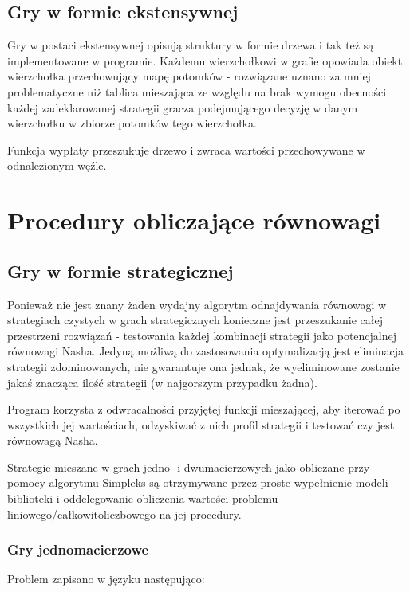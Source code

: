 \documentclass[polish]{standalone}
\begin{document}
\subsection{Gry w formie ekstensywnej}

Gry w postaci ekstensywnej opisują struktury w formie drzewa i tak też są implementowane w programie. Każdemu 
wierzchołkowi w grafie opowiada obiekt wierzchołka przechowujący mapę potomków - rozwiązane uznano za mniej
problematyczne niż tablica mieszająca ze względu na brak wymogu obecności każdej zadeklarowanej strategii gracza
podejmującego decyzję w danym wierzchołku w zbiorze potomków tego wierzchołka.

Funkcja wypłaty przeszukuje drzewo i zwraca wartości przechowywane w odnalezionym węźle.

\section{Procedury obliczające równowagi}

\subsection{Gry w formie strategicznej}

Ponieważ nie jest znany żaden wydajny algorytm odnajdywania równowagi w strategiach czystych w grach strategicznych
konieczne jest przeszukanie całej przestrzeni rozwiązań - testowania każdej kombinacji strategii jako potencjalnej
równowagi Nasha. Jedyną możliwą do zastosowania optymalizacją jest eliminacja strategii zdominowanych, nie gwarantuje
ona jednak, że wyeliminowane zostanie jakaś znacząca ilość strategii (w najgorszym przypadku żadna).

Program korzysta z odwracalności przyjętej funkcji mieszającej, aby iterować po wszystkich jej wartościach, odzyskiwać
z nich profil strategii i testować czy jest równowagą Nasha.

Strategie mieszane w grach jedno- i dwumacierzowych jako obliczane przy pomocy algorytmu Simpleks są otrzymywane przez
proste wypełnienie modeli biblioteki  i oddelegowanie obliczenia wartości problemu
liniowego/całkowitoliczbowego na jej procedury.

\subsubsection{Gry jednomacierzowe}

Problem zapisano w języku  następująco:
\end{document}
